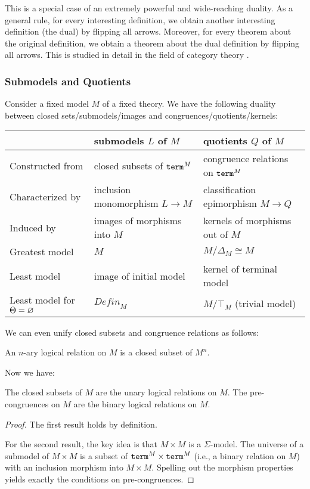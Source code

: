 This is a special case of an extremely powerful and wide-reaching duality.
As a general rule, for every interesting definition, we obtain another interesting definition (the dual) by flipping all arrows.
Moreover, for every theorem about the original definition, we obtain a theorem about the dual definition by flipping all arrows.
This is studied in detail in the field of category theory \cite{categories,categories_awodey}.

\subsubsection{Submodels and Quotients}\label{sec:univ:meta:subquot}

Consider a fixed model $M$ of a fixed theory.
We have the following duality between closed sets/submodels/images and congruences/quotients/kernels:

\begin{center}
\begin{tabular}{|l||l|l|}
\hline
 & submodels $L$ of $M$& quotients $Q$ of $M$ \\
\hline
Constructed from & closed subsets of $\mathtt{term}^M$ & congruence relations on $\mathtt{term}^M$ \\
Characterized by & inclusion monomorphism $L\to M$ & classification epimorphism $M\to Q$ \\
Induced by & images of morphisms into $M$ & kernels of morphisms out of $M$ \\
Greatest model & $M$ & $M/\Delta_M\cong M$ \\
Least model & image of initial model & kernel of terminal model \\
Least model for $\Theta=\varnothing$ & $\mathit{Defin}_M$ & $M/\top_M$ (trivial model) \\
\hline
\end{tabular}
\end{center}

We can even unify closed subsets and congruence relations as follows:
\begin{definition}
An $n$-ary logical relation on $M$ is a closed subset of $M^n$.
\end{definition}

Now we have:
\begin{theorem}\label{thm:univ:closedcong}
The closed subsets of $M$ are the unary logical relations on $M$.
The pre-congruences on $M$ are the binary logical relations on $M$.
\end{theorem}
\begin{proof}
The first result holds by definition.

For the second result, the key idea is that $M\times M$ is a $\Sigma$-model.
The universe of a submodel of $M\times M$ is a subset of $\mathtt{term}^M\times\mathtt{term}^M$ (i.e., a binary relation on $M$) with an inclusion morphism into $M\times M$.
Spelling out the morphism properties yields exactly the conditions on pre-congruences.
\end{proof}

